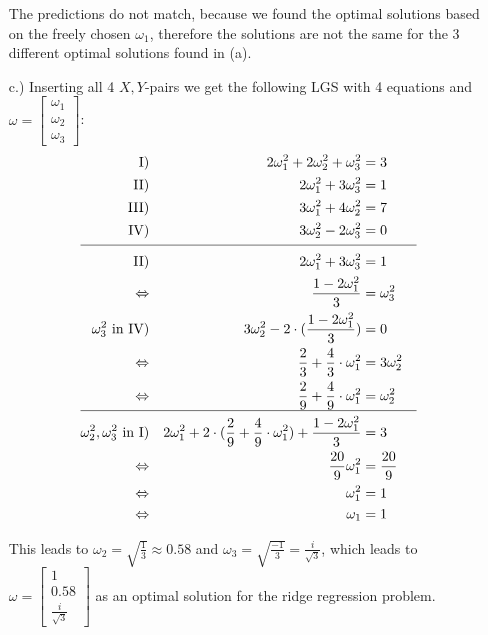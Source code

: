 \documentclass[%
   10pt,              %
   a4paper,           %
   DIV10,             %
]{scrartcl}%
\begin{document}
\begin{itemize}
	\noindent The predictions do not match, because we found the optimal solutions based on the freely chosen $\omega_1$, therefore the solutions are not the same for the 3 different optimal solutions found in (a).
	\item[c.)] Inserting all 4 $X, Y$-pairs we get the following LGS with 4 equations and $\omega = \begin{bmatrix}
	\omega_1\\
	\omega_2\\
	\omega_3
	\end{bmatrix}$:\newline\noindent
	\begin{align*}
	\text{I)} && 2\omega_1^2 + 2\omega_2^2 + \omega_3^2 &= 3 &&\\
	\text{II)} && 2\omega_1^2 + 3\omega_3^2&= 1 &&\\
	\text{III)} && 3\omega_1^2 + 4\omega_2^2&= 7 &&\\
	\text{IV)} && 3\omega_2^2 - 2\omega_3^2&= 0 &&\\[-1.7ex]
	\cline{1-6}
	\text{II)} && 2\omega_1^2 + 3\omega_3^2&=1&&\\
	\text{$\Leftrightarrow$} && \frac{1 - 2\omega_1^2}{3}&= \omega_3^2\\
	\text{$\omega_3^2$ in IV)} && 3\omega_2^2 - 2 \cdot (\frac{1 - 2\omega_1^2}{3})&= 0\\
	\text{$\Leftrightarrow$} && \frac{2}{3} + \frac{4}{3} \cdot \omega_1^2&= 3\omega_2^2\\
	\text{$\Leftrightarrow$} && \frac{2}{9} + \frac{4}{9} \cdot \omega_1^2&= \omega_2^2&&\\[-1.7ex]
	\cline{1-6}
	\text{$\omega_2^2, \omega_3^2$ in I)} &&  2\omega_1^2 + 2 \cdot (\frac{2}{9} + \frac{4}{9} \cdot \omega_1^2) + \frac{1 - 2\omega_1^2}{3}&= 3\\
	\text{$\Leftrightarrow$} && \frac{20}{9} \omega_1^2&=\frac{20}{9}\\
	\text{$\Leftrightarrow$} && \omega_1^2&= 1\\
	\text{$\Leftrightarrow$} && \omega_1&= 1\\
	\end{align*} 
	
	\noindent This leads to $\omega_2 = \sqrt{\frac{1}{3}} \approx 0.58$ and $\omega_3 = \sqrt{\frac{-1}{3}} = \frac{i}{\sqrt{3}}$, which leads to $\omega = \begin{bmatrix}
	1\\
	0.58\\
	\frac{i}{\sqrt{3}}
	\end{bmatrix}$ as an optimal solution for the ridge regression problem.
\end{itemize}
\end{document}
